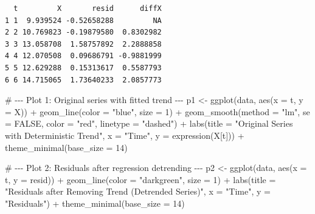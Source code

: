 \documentclass[
  11pt,
  a4paper,
]{report}
\newenvironment{Shaded}{\begin{snugshade}}{\end{snugshade}}
\newcommand{\AttributeTok}[1]{\textcolor[rgb]{0.40,0.45,0.13}{#1}}
\newcommand{\CommentTok}[1]{\textcolor[rgb]{0.37,0.37,0.37}{#1}}
\newcommand{\ConstantTok}[1]{\textcolor[rgb]{0.56,0.35,0.01}{#1}}
\newcommand{\DecValTok}[1]{\textcolor[rgb]{0.68,0.00,0.00}{#1}}
\newcommand{\FunctionTok}[1]{\textcolor[rgb]{0.28,0.35,0.67}{#1}}
\newcommand{\NormalTok}[1]{\textcolor[rgb]{0.00,0.23,0.31}{#1}}
\newcommand{\OtherTok}[1]{\textcolor[rgb]{0.00,0.23,0.31}{#1}}
\newcommand{\SpecialCharTok}[1]{\textcolor[rgb]{0.37,0.37,0.37}{#1}}
\newcommand{\StringTok}[1]{\textcolor[rgb]{0.13,0.47,0.30}{#1}}
\begin{document}
\begin{verbatim}
  t         X       resid      diffX
1 1  9.939524 -0.52658288         NA
2 2 10.769823 -0.19879580  0.8302982
3 3 13.058708  1.58757892  2.2888858
4 4 12.070508  0.09686791 -0.9881999
5 5 12.629288  0.15313617  0.5587793
6 6 14.715065  1.73640233  2.0857773
\end{verbatim}

\begin{Shaded}
\begin{Highlighting}[]
\CommentTok{\# {-}{-}{-} Plot 1: Original series with fitted trend {-}{-}{-}}
\NormalTok{p1 }\OtherTok{\textless{}{-}} \FunctionTok{ggplot}\NormalTok{(data, }\FunctionTok{aes}\NormalTok{(}\AttributeTok{x =}\NormalTok{ t, }\AttributeTok{y =}\NormalTok{ X)) }\SpecialCharTok{+}
  \FunctionTok{geom\_line}\NormalTok{(}\AttributeTok{color =} \StringTok{"blue"}\NormalTok{, }\AttributeTok{size =} \DecValTok{1}\NormalTok{) }\SpecialCharTok{+}
  \FunctionTok{geom\_smooth}\NormalTok{(}\AttributeTok{method =} \StringTok{"lm"}\NormalTok{, }\AttributeTok{se =} \ConstantTok{FALSE}\NormalTok{, }\AttributeTok{color =} \StringTok{"red"}\NormalTok{, }\AttributeTok{linetype =} \StringTok{"dashed"}\NormalTok{) }\SpecialCharTok{+}
  \FunctionTok{labs}\NormalTok{(}\AttributeTok{title =} \StringTok{"Original Series with Deterministic Trend"}\NormalTok{,}
       \AttributeTok{x =} \StringTok{"Time"}\NormalTok{, }\AttributeTok{y =} \FunctionTok{expression}\NormalTok{(X[t])) }\SpecialCharTok{+}
  \FunctionTok{theme\_minimal}\NormalTok{(}\AttributeTok{base\_size =} \DecValTok{14}\NormalTok{)}

\CommentTok{\# {-}{-}{-} Plot 2: Residuals after regression detrending {-}{-}{-}}
\NormalTok{p2 }\OtherTok{\textless{}{-}} \FunctionTok{ggplot}\NormalTok{(data, }\FunctionTok{aes}\NormalTok{(}\AttributeTok{x =}\NormalTok{ t, }\AttributeTok{y =}\NormalTok{ resid)) }\SpecialCharTok{+}
  \FunctionTok{geom\_line}\NormalTok{(}\AttributeTok{color =} \StringTok{"darkgreen"}\NormalTok{, }\AttributeTok{size =} \DecValTok{1}\NormalTok{) }\SpecialCharTok{+}
  \FunctionTok{labs}\NormalTok{(}\AttributeTok{title =} \StringTok{"Residuals after Removing Trend (Detrended Series)"}\NormalTok{,}
       \AttributeTok{x =} \StringTok{"Time"}\NormalTok{, }\AttributeTok{y =} \StringTok{"Residuals"}\NormalTok{) }\SpecialCharTok{+}
  \FunctionTok{theme\_minimal}\NormalTok{(}\AttributeTok{base\_size =} \DecValTok{14}\NormalTok{)}


\end{Highlighting}
\end{Shaded}
\end{document}
